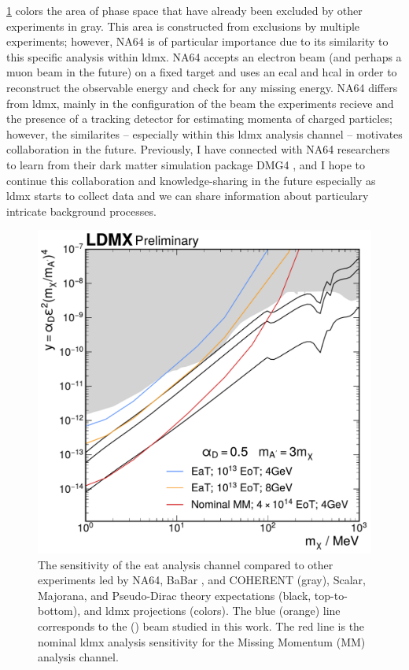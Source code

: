 \cref{fig:reach} colors the area of phase space that have already been excluded by other experiments in gray.
This area is constructed from exclusions by multiple experiments; however, NA64 \cite{na64_results_2019, na64_2020}
is of particular importance due to its similarity to this specific analysis within \ac{ldmx}.
NA64 accepts an electron beam (and perhaps a muon beam in the future) on a fixed target and uses an
\ac{ecal} and \ac{hcal} in order to reconstruct the observable energy and check for any missing energy.
NA64 differs from \ac{ldmx}, mainly in the configuration of the beam the experiments recieve and the presence
of a tracking detector for estimating momenta of charged particles; however, the similarites -- especially
within this \ac{ldmx} analysis channel -- motivates collaboration in the future.
Previously, I have connected with NA64 researchers to learn from their dark matter simulation package
DMG4 \cite{dmg4-2021,dmg4-2024}, and I hope to continue this collaboration and knowledge-sharing in the future
especially as \ac{ldmx} starts to collect data and we can share information about particulary intricate
background processes.

\begin{figure}
  \centering
  \includegraphics[width=\textwidth]{figures/ldmx/analysis/reach.pdf}
  \caption{%
    The sensitivity of the \ac{eat} analysis channel compared to
    other experiments led by NA64\cite{na64_results_2019,na64_2020}, BaBar \cite{babar-2017},
    and COHERENT\cite{coherent_2023} (gray),
    Scalar, Majorana, and Pseudo-Dirac theory expectations (black, top-to-bottom), and \ac{ldmx} projections (colors).
    The blue (orange) line corresponds to the \fourgev (\eightgev) beam studied in this work.
    The red line is the nominal \ac{ldmx} analysis sensitivity for the Missing Momentum (MM) analysis channel.
  }
  \label{fig:reach}
\end{figure}
